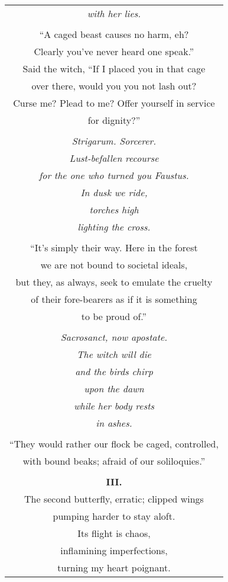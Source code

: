 \documentclass{article}
\begin{document}
\begin{center}
\begin{longtable}{c}
\textit{with her lies.} \\
\\
``A caged beast causes no harm, eh? \\
Clearly you've never heard one speak.'' \\
Said the witch, ``If I placed you in that cage \\
over there, would you you not lash out? \\
Curse me? Plead to me? Offer yourself in service \\
for dignity?'' \\
\\
\textit{Strigarum. Sorcerer.} \\
\textit{Lust-befallen recourse} \\
\textit{for the one who turned you Faustus.} \\
\textit{In dusk we ride,} \\
\textit{torches high} \\
\textit{lighting the cross.} \\
\\
``It's simply their way. Here in the forest \\
we are not bound to societal ideals, \\
but they, as always, seek to emulate the cruelty \\
of their fore-bearers as if it is something \\
to be proud of.'' \\
\\
\textit{Sacrosanct, now apostate.} \\
\textit{The witch will die} \\
\textit{and the birds chirp} \\
\textit{upon the dawn} \\
\textit{while her body rests} \\
\textit{in ashes.} \\
\\
``They would rather our flock be caged, controlled, \\
with bound beaks; afraid of our soliloquies.'' \\
\\
\textbf{III.} \\ %
The second butterfly, erratic; clipped wings \\
pumping harder to stay aloft. \\
Its flight is chaos, \\
inflamining imperfections, \\
turning my heart poignant. \\
\end{longtable}
\end{center}
\end{document}
